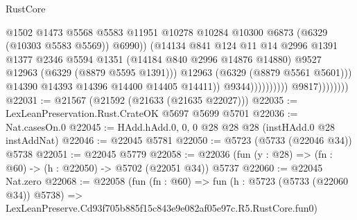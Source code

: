 \begin{lexlean}{RustCore}
\begin{coremodule}
                                                  @1502
                                                  @1473
                                                  @5568
                                                  @5583
                                                  @11951
                                                  @10278
                                                  @10284
                                                  @10300
                                                  @6873
                                                  (@6329 (@10303 @5583 @5569))
                                                  @6990))
                                              (@14134
                                                @841
                                                @124
                                                @11
                                                @14
                                                @2996
                                                @1391
                                                @1377
                                                @2346
                                                @5594
                                                @1351
                                                (@14184 @840 @2996 @14876 @14880)
                                                @9527
                                                @12963
                                                (@6329 (@8879 @5595 @1391)))
                                              @12963
                                              (@6329 (@8879 @5561 @5601)))
                                            @14390
                                            @14393
                                            @14396
                                            @14400
                                            @14405
                                            @14411))
                                        @9344))))))))))
                    @9817))))))))
@22031 := @21567 (@21592 (@21633 (@21635 @22027)))
@22035 := LexLeanPreservation.Rust.CrateOK @5697 @5699 @5701
@22036 := Nat.casesOn.{0}
@22045 := HAdd.hAdd.{0, 0, 0} @28 @28 @28 (instHAdd.{0} @28 instAddNat)
@22046 := @22045 @5781
@22050 := @5723 (@5733 (@22046 @34)) @5738
@22051 := @22045 @5779
@22058 := @22036 (fun (y : @28) => (fn : @60) -> (h : @22050) -> @5702 (@22051 @34)) @5737
@22060 := @22045 Nat.zero
@22068 := @22058
    (fun (fn : @60) =>
    fun (h : @5723 (@5733 (@22060 @34)) @5738) =>
    LexLeanPreserve.Cd93f705b885f15c843e9e082af05e97c.R5.RustCore.fun0)

\end{coremodule}
\end{lexlean}
